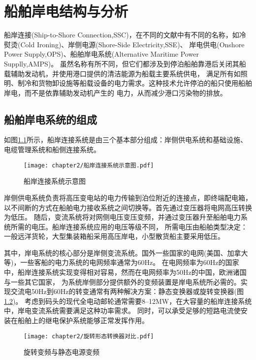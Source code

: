 \chapter{船舶岸电结构与分析}

船岸连接(Ship-to-Shore Connection,SSC)，在不同的文献中有不同的名称，如冷熨烫(Cold Ironing)、岸侧电源(Shore-Side Electricity,SSE)、
岸电供电(Onshore Power Supply,OPS)、船舶岸电系统(Alternative Maritime Power Supplly,AMPS)。
虽然名称有所不同，但它们都涉及到停泊船舶靠港后关闭其船载辅助发动机，并使用港口提供的清洁能源为船载主要系统供电，
满足所有如照明、制冷和货物卸设施等船载设备的电力需求。这种技术允许停泊的船只使用船舶岸电，而不是依靠辅助发动机产生的
电力，从而减少港口污染物的排放。

\section{船舶岸电系统的组成}

如图\ref{fig:船岸连接系统示意图}所示，船岸连接系统是由三个基本部分组成：岸侧供电系统和基础设施、电缆管理系统和船侧连接系统。

\begin{figure}[!htp]
	\centering
	\texttt{[image: chapter2/船岸连接系统示意图.pdf]}
	\caption{船岸连接系统示意图}
	\label{fig:船岸连接系统示意图}
\end{figure}

岸侧供电系统负责将高压变电站的电力传输到泊位附近的连接点，即终端配电箱，以不间断的方式在船舶电力接收系统之间切换等。首先通过变压器将电网高压转换为低压。
随后，变流系统将对网侧电压变压变频，并通过变压器升至船舶电力系统所需的电压。船岸连接系统应用的电压等级不同，
所需电压由船舶类型决定：一般远洋货轮，大型集装箱船采用高压岸电，小型散货船主要采用低压。

其中，岸电系统的核心部分是岸侧变流系统。国外一些国家的电网(美国、加拿大等)，一些客船的电力系统的电网频率通常为60Hz。
在电网频率为60Hz的国家中，船岸连接系统实现变得相对容易，然而在电网频率为50Hz的中国，欧洲诸国与一些其它国家，
为系统岸侧部分提供额外的变频装置是岸电系统所必需的。实现交流电50Hz到60Hz的转变通常有两种解决方案：静态变换器或旋转变换器(图\ref{fig:传统旋转变频与静态电源变频对比})。
考虑到码头的现代全电动邮轮通常需要8–12\si{MW}\cite{SP15}，在大容量的船岸连接系统中，岸电变流系统需要满足这种功率需求。
同时，可以承受足够的短路电流使安装在船舶上的继电保护系统能够正常发挥作用。

\begin{figure}[!htp]
	\centering
	\texttt{[image: chapter2/旋转形态转换器对比.pdf]}
	\caption{旋转变频与静态电源变频}
	\label{fig:传统旋转变频与静态电源变频对比}
\end{figure}

